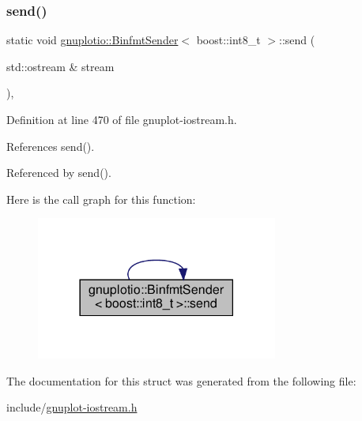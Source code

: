 \subsubsection{\texorpdfstring{send()}{send()}}
{\footnotesize\ttfamily static void \hyperlink{structgnuplotio_1_1_binfmt_sender}{gnuplotio\+::\+Binfmt\+Sender}$<$ boost\+::int8\+\_\+t $>$\+::send (\begin{DoxyParamCaption}\item[{std\+::ostream \&}]{stream }\end{DoxyParamCaption})\hspace{0.3cm}{\ttfamily [inline]}, {\ttfamily [static]}}



Definition at line 470 of file gnuplot-\/iostream.\+h.



References send().



Referenced by send().

Here is the call graph for this function\+:\nopagebreak
\begin{figure}[H]
\begin{center}
\leavevmode
\includegraphics[width=225pt]{structgnuplotio_1_1_binfmt_sender_3_01boost_1_1int8__t_01_4_a6f61d43b0da25f044bfad0d45fe888b4_cgraph}
\end{center}
\end{figure}


The documentation for this struct was generated from the following file\+:\begin{DoxyCompactItemize}
\item 
include/\hyperlink{gnuplot-iostream_8h}{gnuplot-\/iostream.\+h}\end{DoxyCompactItemize}
